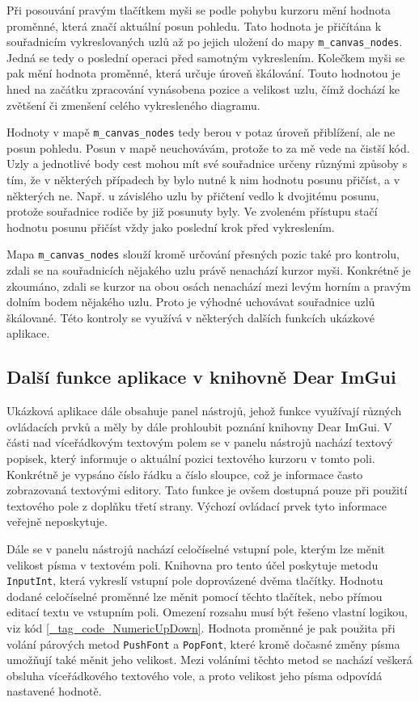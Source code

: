 \documentclass[FM,DP]{tulthesis}
\begin{document}
	Při posouvání pravým tlačítkem myši se podle pohybu kurzoru mění hodnota proměnné, která značí aktuální posun pohledu. Tato hodnota je přičítána k souřadnicím vykreslovaných uzlů až po jejich uložení do mapy \texttt{m\_canvas\_nodes}. Jedná se tedy o poslední operaci před samotným vykreslením. Kolečkem myši se pak mění hodnota proměnné, která určuje úroveň škálování. Touto hodnotou je hned na začátku zpracování vynásobena pozice a velikost uzlu, čímž dochází ke zvětšení či zmenšení celého vykresleného diagramu.
	
	Hodnoty v mapě \texttt{m\_canvas\_nodes} tedy berou v potaz úroveň přiblížení, ale ne posun pohledu. Posun v mapě neuchovávám, protože to za mě vede na čistší kód. Uzly a jednotlivé body cest mohou mít své souřadnice určeny různými způsoby s tím, že v některých případech by bylo nutné k nim hodnotu posunu přičíst, a v některých ne. Např. u závislého uzlu by přičtení vedlo k dvojitému posunu, protože souřadnice rodiče by již posunuty byly. Ve zvoleném přístupu stačí hodnotu posunu přičíst vždy jako poslední krok před vykreslením.%
	
	Mapa \texttt{m\_canvas\_nodes} slouží kromě určování přesných pozic také pro kontrolu, zdali se na souřadnicích nějakého uzlu právě nenachází kurzor myši. Konkrétně je zkoumáno, zdali se kurzor na obou osách nenachází mezi levým horním a pravým dolním bodem nějakého uzlu. Proto je výhodné uchovávat souřadnice uzlů škálované. Této kontroly se využívá v některých dalších funkcích ukázkové aplikace.
	
	\subsection{Další funkce aplikace v knihovně Dear ImGui}
	
	Ukázková aplikace dále obsahuje panel nástrojů, jehož funkce využívají různých ovládacích prvků a měly by dále prohloubit poznání knihovny Dear ImGui. V části nad víceřádkovým textovým polem se v panelu nástrojů nachází textový popisek, který informuje o aktuální pozici textového kurzoru v tomto poli. Konkrétně je vypsáno číslo řádku a číslo sloupce, což je informace často zobrazovaná textovými editory. Tato funkce je ovšem dostupná pouze při použití textového pole z doplňku třetí strany. Výchozí ovládací prvek tyto informace veřejně neposkytuje.
	
	Dále se v panelu nástrojů nachází celočíselné vstupní pole, kterým lze měnit velikost písma v textovém poli. Knihovna pro tento účel poskytuje metodu \texttt{InputInt}, která vykreslí vstupní pole doprovázené dvěma tlačítky. Hodnotu dodané celočíselné proměnné lze měnit pomocí těchto tlačítek, nebo přímou editací textu ve vstupním poli. Omezení rozsahu musí být řešeno vlastní logikou, viz kód \ref{_tag_code_NumericUpDown}. Hodnota proměnné je pak použita při volání párových metod \texttt{PushFont} a \texttt{PopFont}, které kromě dočasné změny písma umožňují také měnit jeho velikost. Mezi voláními těchto metod se nachází veškerá obsluha víceřádkového textového vole, a proto velikost jeho písma odpovídá nastavené hodnotě.
	
\end{document}
